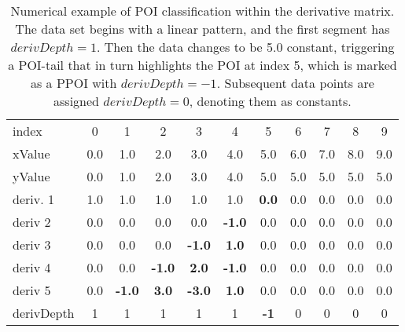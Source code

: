 \documentclass[main.tex]{subfiles}
\begin{document}
  
  \begin{table}[h]
    \caption{Numerical example of POI classification within the derivative matrix. The data set begins with a linear pattern, and the first segment has $derivDepth=1$. Then the data changes to be 5.0 constant, triggering a POI-tail that in turn highlights the POI at index 5, which is marked as a PPOI with $derivDepth=-1$. Subsequent data points are assigned $derivDepth=0$, denoting them as constants.}
    \centering
    \begin{tabularx}{0.85\textwidth}{ X | c c c c c c c c c c }
      index & 0 & 1 & 2 & 3 & 4 & 5 & 6 & 7 & 8 & 9 \\
      xValue & 0.0 & 1.0 & 2.0 & 3.0 & 4.0 & 5.0 & 6.0 & 7.0 & 8.0 & 9.0 \\
      \hline \hline
      yValue & 0.0 & 1.0 & 2.0 & 3.0 & 4.0 & 5.0 & 5.0 &  5.0 & 5.0 & 5.0 \\
      \hline
      deriv. 1 & 1.0 & 1.0 & 1.0 & 1.0 & 1.0 & \textbf{0.0} & 0.0 & 0.0 & 0.0 & 0.0 \\
      deriv 2 & 0.0 & 0.0 & 0.0 & 0.0 & \textbf{-1.0} & 0.0 & 0.0 & 0.0 & 0.0 & 0.0 \\
      deriv 3 & 0.0 & 0.0 & 0.0 & \textbf{-1.0} & \textbf{1.0} & 0.0 & 0.0 & 0.0 & 0.0 & 0.0 \\   
      deriv 4 & 0.0 & 0.0 & \textbf{-1.0} & \textbf{2.0} & \textbf{-1.0} & 0.0 & 0.0 & 0.0 & 0.0 & 0.0 \\  
      deriv 5 & 0.0 & \textbf{-1.0} & \textbf{3.0} & \textbf{-3.0} & \textbf{1.0} & 0.0 & 0.0 & 0.0 & 0.0 & 0.0\\
      \hline
      derivDepth & 1 & 1 & 1 & 1 & 1 & \textbf{-1} & 0 & 0 & 0 & 0 \\   
    \end{tabularx}
    \label{tbl:mtrx:poi}
  \end{table}
\end{document}
